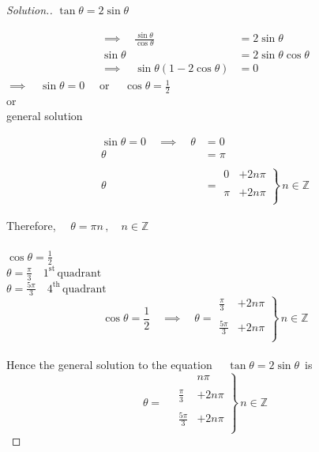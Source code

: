 \documentclass[11pt,a4paper]{article}
\theoremstyle{definition}
\newenvironment{solution}
  {\renewcommand{\qedsymbol}{}\begin{proof}[\textit{Solution}.]}
  {\end{proof}}
\begin{document}
\begin{solution}

$\tan \theta = 2\sin \theta$

\begin{align*}
\implies\quad  \frac{\sin \theta}{\cos \theta} & = 2\sin \theta\\
\sin \theta & = 2\sin \theta \cos \theta\\
\implies \quad  \sin \theta ( 1 - 2\cos \theta ) & = 0\
\end{align*}
$\implies\quad  \sin \theta = 0\quad $ or $\quad  \cos \theta = \frac{1}{2}$\\

or\\

general solution

\begin{align*}
\sin \theta = 0 \quad  \implies \quad  \theta & = 0\\
\theta & = \pi\\\\
\theta & = \left.\begin{aligned}
0 & + 2n\pi\\\\
\pi & + 2n\pi\\
\end{aligned}
\right\} \, n\in \mathbb{Z}
\end{align*}

Therefore, $\quad  \theta = \pi n \,, \quad  n \in \mathbb{Z}$\\\\




$\cos \theta = \frac{1}{2}$\\

$\theta = \frac{\pi}{3}\quad 1^{\text{st}}\,\text{quadrant}$\\

$\theta = \frac{5\pi}{3}\quad 4^{\text{th}}\,\text{quadrant}$\\

$$\cos \theta = \frac{1}{2} \quad  \implies \quad  \theta = 
\left.\begin{aligned}
\frac{\pi}{3} & + 2n\pi\\\\
\frac{5\pi}{3} & + 2n\pi\\
\end{aligned}
\right\}\, n \in \mathbb{Z}$$\\




Hence the general solution to the equation $\quad  \tan \theta = 2\sin \theta\,$ is 
\[\theta = \quad  \left.\begin{aligned}
& n\pi\\\\
\frac{\pi}{3} & + 2n\pi\\\\
\frac{5\pi}{3} & + 2n\pi\\
\end{aligned}
\right\}\, n \in \mathbb{Z}\]
\end{solution}
\end{document}
